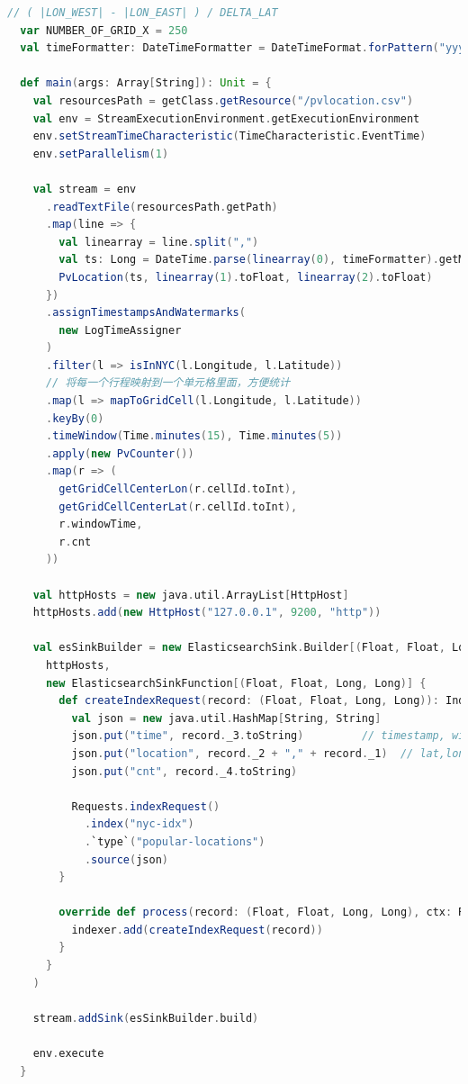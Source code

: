 \documentclass[oneside]{ctexbook}
\begin{document}
\begin{lstlisting}[language=scala]
  // ( |LON_WEST| - |LON_EAST| ) / DELTA_LAT
  var NUMBER_OF_GRID_X = 250
  val timeFormatter: DateTimeFormatter = DateTimeFormat.forPattern("yyyy-MM-dd HH:mm:ss").withLocale(Locale.US).withZoneUTC

  def main(args: Array[String]): Unit = {
    val resourcesPath = getClass.getResource("/pvlocation.csv")
    val env = StreamExecutionEnvironment.getExecutionEnvironment
    env.setStreamTimeCharacteristic(TimeCharacteristic.EventTime)
    env.setParallelism(1)

    val stream = env
      .readTextFile(resourcesPath.getPath)
      .map(line => {
        val linearray = line.split(",")
        val ts: Long = DateTime.parse(linearray(0), timeFormatter).getMillis
        PvLocation(ts, linearray(1).toFloat, linearray(2).toFloat)
      })
      .assignTimestampsAndWatermarks(
        new LogTimeAssigner
      )
      .filter(l => isInNYC(l.Longitude, l.Latitude))
      // 将每一个行程映射到一个单元格里面，方便统计
      .map(l => mapToGridCell(l.Longitude, l.Latitude))
      .keyBy(0)
      .timeWindow(Time.minutes(15), Time.minutes(5))
      .apply(new PvCounter())
      .map(r => (
        getGridCellCenterLon(r.cellId.toInt),
        getGridCellCenterLat(r.cellId.toInt),
        r.windowTime,
        r.cnt
      ))

    val httpHosts = new java.util.ArrayList[HttpHost]
    httpHosts.add(new HttpHost("127.0.0.1", 9200, "http"))

    val esSinkBuilder = new ElasticsearchSink.Builder[(Float, Float, Long, Long)](
      httpHosts,
      new ElasticsearchSinkFunction[(Float, Float, Long, Long)] {
        def createIndexRequest(record: (Float, Float, Long, Long)): IndexRequest = {
          val json = new java.util.HashMap[String, String]
          json.put("time", record._3.toString)         // timestamp, windowend time
          json.put("location", record._2 + "," + record._1)  // lat,lon pair
          json.put("cnt", record._4.toString)

          Requests.indexRequest()
            .index("nyc-idx")
            .`type`("popular-locations")
            .source(json)
        }

        override def process(record: (Float, Float, Long, Long), ctx: RuntimeContext, indexer: RequestIndexer): Unit = {
          indexer.add(createIndexRequest(record))
        }
      }
    )

    stream.addSink(esSinkBuilder.build)

    env.execute
  }


\end{lstlisting}
\end{document}
